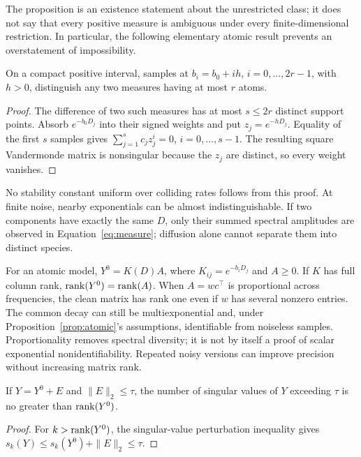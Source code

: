 The proposition is an existence statement about the unrestricted class; it does not say that every positive measure is ambiguous under every finite-dimensional restriction. In particular, the following elementary atomic result prevents an overstatement of impossibility.

\begin{Proposition}\label{prop:atomic}
On a compact positive interval, samples at $b_i=b_0+ih$, $i=0,\ldots,2r-1$, with $h>0$, distinguish any two measures having at most $r$ atoms.
\end{Proposition}
\begin{proof}
The difference of two such measures has at most $s\leq2r$ distinct support points. Absorb $e^{-b_0D_j}$ into their signed weights and put $z_j=e^{-hD_j}$. Equality of the first $s$ samples gives $\sum_{j=1}^s c_j z_j^i=0$, $i=0,\ldots,s-1$. The resulting square Vandermonde matrix is nonsingular because the $z_j$ are distinct, so every weight vanishes.
\end{proof}

No stability constant uniform over colliding rates follows from this proof. At finite noise, nearby exponentials can be almost indistinguishable. If two components have exactly the same $D$, only their summed spectral amplitudes are observed in Equation~\eqref{eq:measure}; diffusion alone cannot separate them into distinct species.

For an atomic model, $Y^0=K(D)A$, where $K_{ij}=e^{-b_iD_j}$ and $A\geq0$. If $K$ has full column rank, $\operatorname{rank}(Y^0)=\operatorname{rank}(A)$. When $A=wc^\top$ is proportional across frequencies, the clean matrix has rank one even if $w$ has several nonzero entries. The common decay can still be multiexponential and, under Proposition~\ref{prop:atomic}'s assumptions, identifiable from noiseless samples. Proportionality removes spectral diversity; it is not by itself a proof of scalar exponential nonidentifiability. Repeated noisy versions can improve precision without increasing matrix rank.

\begin{Proposition}\label{prop:rank}
If $Y=Y^0+E$ and $\|E\|_2\leq\tau$, the number of singular values of $Y$ exceeding $\tau$ is no greater than $\operatorname{rank}(Y^0)$.
\end{Proposition}
\begin{proof}
For $k>\operatorname{rank}(Y^0)$, the singular-value perturbation inequality gives $s_k(Y)\leq s_k(Y^0)+\|E\|_2\leq\tau$.
\end{proof}

